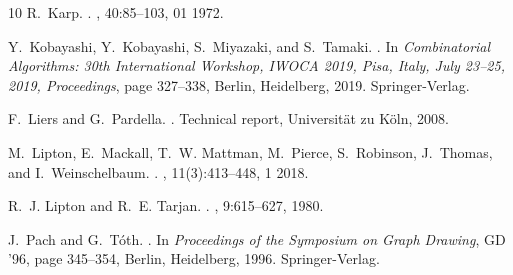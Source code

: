 \documentclass[10pt,fleqn]{article}
\begin{document}
\begin{thebibliography}{10}
	R.~Karp.
	.
	, 40:85--103, 01 1972.
	
	Y.~Kobayashi, Y.~Kobayashi, S.~Miyazaki, and S.~Tamaki.
	.
	\newblock In {\em {Combinatorial Algorithms: 30th International Workshop, IWOCA
			2019, Pisa, Italy, July 23–25, 2019, Proceedings}}, page 327–338, Berlin,
	Heidelberg, 2019. Springer-Verlag.
	
	F.~Liers and G.~Pardella.
	.
	\newblock Technical report, Universit{\"a}t zu K{\"o}ln, 2008.
	
	M.~Lipton, E.~Mackall, T.~W. Mattman, M.~Pierce, S.~Robinson, J.~Thomas, and
	I.~Weinschelbaum.
	.
	, 11(3):413–448, 1 2018.
	
	R.~J. Lipton and R.~E. Tarjan.
	.
	, 9:615--627, 1980.
	
	J.~Pach and G.~T\'{o}th.
	.
	\newblock In {\em {Proceedings of the Symposium on Graph Drawing}}, GD '96,
	page 345–354, Berlin, Heidelberg, 1996. Springer-Verlag.
	
\end{thebibliography}

	
	
	
	
	
	\appendix
	
\end{document}
